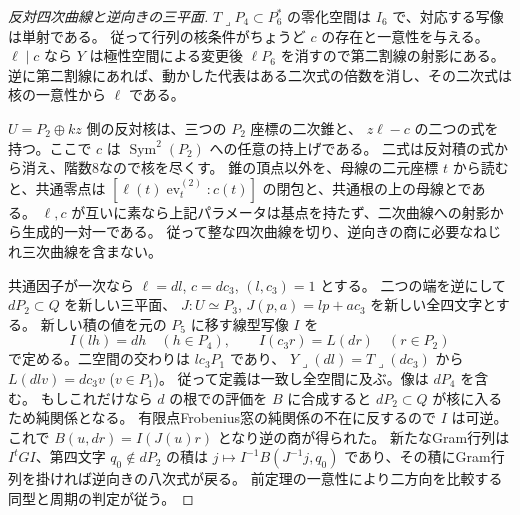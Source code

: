 \begin{proof}[反対四次曲線と逆向きの三平面]
$T\mathbin{\lrcorner}P_4\subset P_6^*$ の零化空間は $I_6$ で、対応する写像は単射である。
従って行列の核条件がちょうど $c$ の存在と一意性を与える。
$\ell\mid c$ なら $Y$ は極性空間による変更後 $\ell P_6$ を消すので第二割線の射影にある。
逆に第二割線にあれば、動かした代表はある二次式の倍数を消し、その二次式は核の一意性から $\ell$ である。

$U=P_2\oplus kz$ 側の反対核は、三つの $P_2$ 座標の二次錐と、
$z\ell-c$ の二つの式を持つ。ここで $c$ は $\operatorname{Sym}^2(P_2)$ への任意の持上げである。
二式は反対積の式から消え、階数8なので核を尽くす。
錐の頂点以外を、母線の二元座標 $t$ から読むと、共通零点は
$[\ell(t)\operatorname{ev}^{(2)}_t:c(t)]$ の閉包と、共通根の上の母線とである。
$\ell,c$ が互いに素なら上記パラメータは基点を持たず、二次曲線への射影から生成的一対一である。
従って整な四次曲線を切り、逆向きの商に必要なねじれ三次曲線を含まない。

共通因子が一次なら $\ell=dl$, $c=dc_3$, $(l,c_3)=1$ とする。
二つの端を逆にして $dP_2\subset Q$ を新しい三平面、
$J:U\simeq P_3$, $J(p,a)=lp+a c_3$ を新しい全四文字とする。
新しい積の値を元の $P_5$ に移す線型写像 $I$ を
\[
         I(lh)=dh\quad(h\in P_4),\qquad I(c_3 r)=L(dr)\quad(r\in P_2)
\]
で定める。二空間の交わりは $lc_3P_1$ であり、
$Y\mathbin{\lrcorner}(dl)=T\mathbin{\lrcorner}(dc_3)$ から $L(dl v)=dc_3v$ ($v\in P_1$)。
従って定義は一致し全空間に及ぶ。像は $dP_4$ を含む。
もしこれだけなら $d$ の根での評価を $B$ に合成すると $dP_2\subset Q$ が核に入るため純関係となる。
有限点Frobenius窓の純関係の不在に反するので $I$ は可逆。
これで $B(u,dr)=I(J(u)r)$ となり逆の商が得られた。
新たなGram行列は $I^tGI$、第四文字 $q_0\notin dP_2$ の積は
$j\mapsto I^{-1} B(J^{-1}j,q_0)$ であり、その積にGram行列を掛ければ逆向きの八次式が戻る。
前定理の一意性により二方向を比較する同型と周期の判定が従う。
\end{proof}
